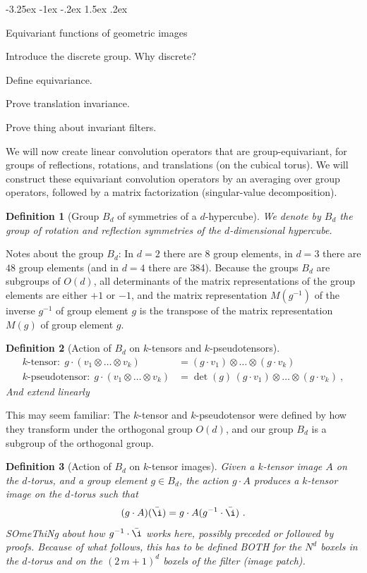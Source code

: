 \documentclass{article}
\makeatletter
\theoremstyle{plain}
\newtheorem{definition}{Definition}
\renewcommand\section{\@startsection {section}{1}{\z@}%
  {-3.25ex \@plus -1ex \@minus -.2ex}%
  {1.5ex \@plus .2ex}%
  {\raggedright\normalfont\large\bfseries}}
\makeatother
\begin{document}
\section{Equivariant functions of geometric images}\label{sec:equivariant}

Introduce the discrete group. Why discrete?

Define equivariance.

Prove translation invariance.

Prove thing about invariant filters.

We will now create linear convolution operators that are group-equivariant, for groups of reflections, rotations, and translations (on the cubical torus).
We will construct these equivariant convolution operators by an averaging over group operators, followed by a matrix factorization (singular-value decomposition).

\begin{definition}[Group $B_d$ of symmetries of a $d$-hypercube]
We denote by $B_d$ the group of rotation and reflection symmetries of the $d$-dimensional hypercube.
\end{definition}

Notes about the group $B_d$: In $d=2$ there are $8$ group elements, in $d=3$ there are $48$ group elements (and in $d=4$ there are 384). Because the groups $B_d$ are subgroups of $O(d)$, all determinants of the matrix representations of the group elements are either $+1$ or $-1$, and the matrix representation $M(g^{-1})$ of the inverse $g^{-1}$ of group element $g$ is the transpose of the matrix representation $M(g)$ of group element $g$.

\begin{definition}[Action of $B_d$ on $k$-tensors and $k$-pseudotensors]
\begin{align}
\mbox{$k$-tensor:} ~~ g\cdot(v_1 \otimes \ldots \otimes v_k) &= (g\cdot v_1)\otimes\ldots\otimes(g\cdot v_k) \\
\mbox{$k$-pseudotensor:} ~~ g\cdot(v_1 \otimes \ldots \otimes v_k) &= \det(g)\,(g\cdot v_1)\otimes\ldots\otimes(g\cdot v_k) ~,
\end{align}
And extend linearly
\end{definition}

This may seem familiar: The $k$-tensor and $k$-pseudotensor were defined by how they transform under the orthogonal group $O(d)$, and our group $B_d$ is a subgroup of the orthogonal group.

\begin{definition}[Action of $B_d$ on $k$-tensor images]
Given a $k$-tensor image $A$ on the $d$-torus, and a group element $g\in B_d$, the action $g\cdot A$ produces a $k$-tensor image on the $d$-torus such that
\begin{equation}
    (g\cdot A)(\bar\i) = g\cdot A({g^{-1}\cdot \bar\i}) ~.
\end{equation}
SOmeThiNg about how $g^{-1}\cdot\bar\i$ works here, possibly preceded or followed by proofs. Because of what follows, this has to be defined BOTH for the $N^d$ boxels in the $d$-torus and on the $(2\,m+1)^d$ boxels of the filter (image patch).
\end{definition}
\end{document}
